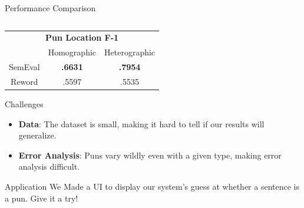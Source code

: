 \documentclass[final]{beamer}
\newlength{\onecolwid}
\begin{document}
\begin{frame}[t]
\begin{columns}[t]
\begin{column}{\onecolwid}
\begin{block}{Performance Comparison}
\begin{center}
\begin{tabular}{ c|c|c }
					\end{tabular}
				\end{center}
				\vspace{10mm}
				\begin{center}
					\begin{tabular}{ c|c|c } 
						\multicolumn{3}{c}{\textbf{Pun Location F-1}}\\
						 & Homographic & Heterographic \\ 
						\hline
						SemEval & \textbf{.6631} & \textbf{.7954} \\ 
						\hline
						Reword & .5597 & .5535 \\ 
					\end{tabular}
				\end{center}
            \end{block}
            \vspace{20mm}
            \begin{block}{Challenges}
				\large{
					\begin{itemize}
						\item {\textbf{Data}:
							The dataset is small, making it hard to tell if our results will generalize.
						}
						\item {\textbf{Error Analysis}:
							Puns vary wildly even with a given type, making error analysis difficult.
						}
					\end{itemize}
				}
            \end{block}
            \vspace{20mm}
			\begin{block}{Application}
				\large{
					We Made a UI to display our system's guess at whether a sentence is a pun. Give it a try!
				}
				\vspace{20mm}


\end{block}
\end{column}
\end{columns}
\end{frame}
\end{document}
